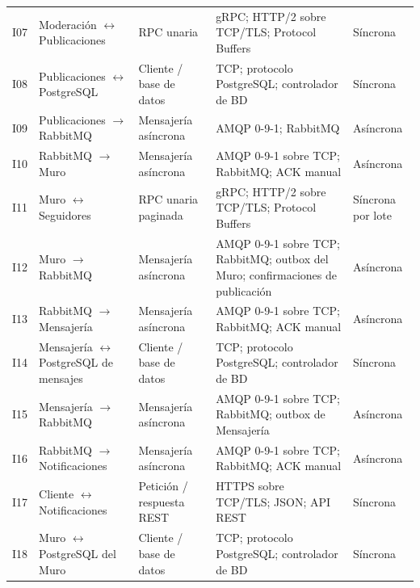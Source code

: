 \documentclass[12pt,a4paper]{article}
\begin{document}
\begin{longtable}{@{}p{0.9cm}p{4.4cm}p{2.7cm}p{4.4cm}p{1.8cm}@{}}
I07 &
Moderación $\leftrightarrow$ Publicaciones &
RPC unaria &
gRPC; HTTP/2 sobre TCP/TLS; Protocol Buffers &
Síncrona \\

I08 &
Publicaciones $\leftrightarrow$ PostgreSQL &
Cliente / base de datos &
TCP; protocolo PostgreSQL; controlador de BD &
Síncrona \\

I09 &
Publicaciones $\rightarrow$ RabbitMQ &
Mensajería asíncrona &
AMQP 0-9-1; RabbitMQ &
Asíncrona \\

I10 &
RabbitMQ $\rightarrow$ Muro &
Mensajería asíncrona &
AMQP 0-9-1 sobre TCP; RabbitMQ; ACK manual &
Asíncrona \\

I11 &
Muro $\leftrightarrow$ Seguidores &
RPC unaria paginada &
gRPC; HTTP/2 sobre TCP/TLS; Protocol Buffers &
Síncrona por lote \\

I12 &
Muro $\rightarrow$ RabbitMQ &
Mensajería asíncrona &
AMQP 0-9-1 sobre TCP; RabbitMQ; outbox del Muro; confirmaciones de publicación &
Asíncrona \\

I13 &
RabbitMQ $\rightarrow$ Mensajería &
Mensajería asíncrona &
AMQP 0-9-1 sobre TCP; RabbitMQ; ACK manual &
Asíncrona \\

I14 &
Mensajería $\leftrightarrow$ PostgreSQL de mensajes &
Cliente / base de datos &
TCP; protocolo PostgreSQL; controlador de BD &
Síncrona \\

I15 &
Mensajería $\rightarrow$ RabbitMQ &
Mensajería asíncrona &
AMQP 0-9-1 sobre TCP; RabbitMQ; outbox de Mensajería &
Asíncrona \\

I16 &
RabbitMQ $\rightarrow$ Notificaciones &
Mensajería asíncrona &
AMQP 0-9-1 sobre TCP; RabbitMQ; ACK manual &
Asíncrona \\

I17 &
Cliente $\leftrightarrow$ Notificaciones &
Petición / respuesta REST &
HTTPS sobre TCP/TLS; JSON; API REST &
Síncrona \\

I18 &
Muro $\leftrightarrow$ PostgreSQL del Muro &
Cliente / base de datos &
TCP; protocolo PostgreSQL; controlador de BD &
Síncrona \\

\end{longtable}
\end{document}
